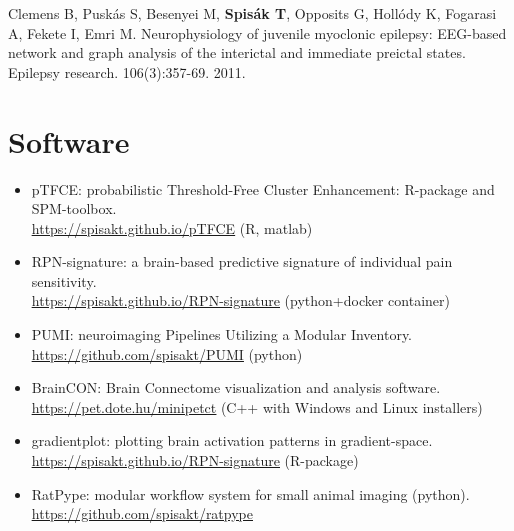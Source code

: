 \documentclass[12pt,a4paper,roman]{moderncv}        %
\begin{document}
Clemens B, Pusk\'as S, Besenyei M, \textbf{Spis\'ak T}, Opposits G, Hollódy K, Fogarasi A, Fekete I, Emri M. Neurophysiology of juvenile myoclonic epilepsy: EEG-based network and graph analysis of the interictal and immediate preictal states. Epilepsy research. 106(3):357-69. 2011.

\section{Software}
\begin{itemize}

\item pTFCE: probabilistic Threshold-Free Cluster Enhancement: R-package and SPM-toolbox. \\ \href{https://spisakt.github.io/pTFCE/}{\color{pniblue}\underline{https://spisakt.github.io/pTFCE}} (R, matlab)

\item RPN-signature: a brain-based predictive signature of individual pain sensitivity. \\ \href{https://spisakt.github.io/RPN-signature}{\color{pniblue}\underline{https://spisakt.github.io/RPN-signature}} (python+docker container)

\item PUMI: neuroimaging Pipelines Utilizing a Modular Inventory. \\ \href{https://github.com/spisakt/PUMI}{\color{pniblue}\underline{https://github.com/spisakt/PUMI}} (python)

\item BrainCON: Brain Connectome visualization and analysis software. \\ \href{https://pet.dote.hu/minipetct/index.php?option=com_k2&view=item&layout=item&id=5&Itemid=13&lang=en}{\color{pniblue}\underline{https://pet.dote.hu/minipetct}} (C++ with Windows and Linux installers)

\item gradientplot: plotting brain activation patterns in gradient-space. \\ \href{https://spisakt.github.io/RPN-signature}{\color{pniblue}\underline{https://spisakt.github.io/RPN-signature}} (R-package)

\item RatPype: modular workflow system for small animal imaging (python). \\
\href{https://github.com/spisakt/ratpype}{\color{pniblue}\underline{https://github.com/spisakt/ratpype}}

\end{itemize}
\end{document}
